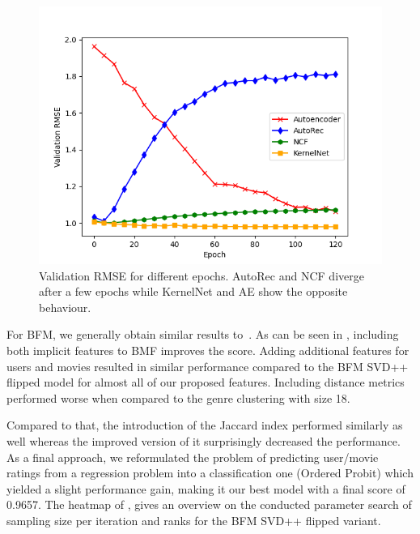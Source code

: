 \documentclass[10pt,conference,compsocconf]{IEEEtran}
\begin{document}
    \begin{figure}
        \includegraphics[width=\columnwidth]{figures/validation_plot.png}
        \caption{Validation RMSE for different epochs.
        AutoRec and NCF diverge after a few epochs while KernelNet and AE show the opposite behaviour.}
        \label{fig:validation}
    \end{figure}

    For BFM, we generally obtain similar results to~\cite{rendle_difficulty_2019}.
    As can be seen in , including both implicit features to BMF improves the score.
    Adding additional features for users and movies resulted in similar performance compared to the BFM SVD++ flipped model
    for almost all of our proposed features.
    Including distance metrics performed worse when compared to the genre clustering with size 18.

    Compared to that, the introduction of the Jaccard index performed similarly as well whereas the improved version of it surprisingly decreased the performance.
    As a final approach, we reformulated the problem of predicting user/movie ratings from a regression problem into a classification one (Ordered Probit) which yielded a slight performance gain, making it our best model with a final score of 0.9657.
    The heatmap of , gives an overview on the conducted parameter search of sampling size per iteration and ranks for the BFM SVD++ flipped variant.
\end{document}

